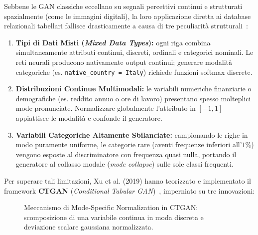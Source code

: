 Sebbene le GAN classiche eccellano su segnali percettivi continui e strutturati spazialmente (come le immagini digitali), la loro applicazione diretta ai database relazionali tabellari fallisce drasticamente a causa di tre peculiarità strutturali~\cite{xu2019}:
\begin{enumerate}
    \item \textbf{Tipi di Dati Misti (\textit{Mixed Data Types}):} ogni riga combina simultaneamente attributi continui, discreti, ordinali e categorici nominali. Le reti neurali producono nativamente output continui; generare modalità categoriche (es. \texttt{native\_country = Italy}) richiede funzioni softmax discrete.
    \item \textbf{Distribuzioni Continue Multimodali:} le variabili numeriche finanziarie o demografiche (es. reddito annuo o ore di lavoro) presentano spesso molteplici mode pronunciate. Normalizzare globalmente l'attributo in $[-1, 1]$ appiattisce le modalità e confonde il generatore.
    \item \textbf{Variabili Categoriche Altamente Sbilanciate:} campionando le righe in modo puramente uniforme, le categorie rare (aventi frequenze inferiori all'$1\%$) vengono esposte al discriminatore con frequenza quasi nulla, portando il generatore al collasso modale (\textit{mode collapse}) sulle sole classi frequenti.
\end{enumerate}

Per superare tali limitazioni, Xu et al. (2019) hanno teorizzato e implementato il framework \textbf{CTGAN} (\textit{Conditional Tabular GAN})~\cite{xu2019}, imperniato su tre innovazioni:

\begin{figure}[H]
\centering
{}
\caption{Meccanismo di Mode-Specific Normalization in CTGAN: scomposizione di una variabile continua in moda discreta e deviazione scalare gaussiana normalizzata.}
\label{fig:dm-ctgan-vgm}
\end{figure}


